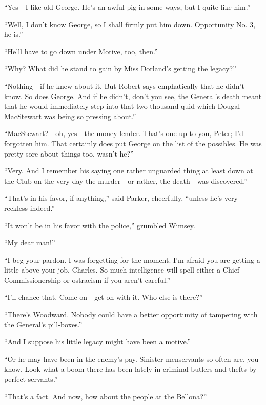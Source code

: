 \enquote{Yes\allowbreak---\allowbreak I like old George. He's an awful pig in some ways, but I quite like him.}

\enquote{Well, I don't know George, so I shall firmly put him down. Opportunity No. 3, he is.}

\enquote{He'll have to go down under Motive, too, then.}

\enquote{Why? What did he stand to gain by Miss Dorland's getting the legacy?}

\enquote{Nothing\allowbreak---\allowbreak if he knew about it. But Robert says emphatically that he didn't know. So does George. And if he didn't, don't you see, the General's death meant that he would immediately step into that two thousand quid which Dougal MacStewart was being so pressing about.}

\enquote{MacStewart?---oh, yes\allowbreak---\allowbreak the money-lender. That's one up to you, Peter; I'd forgotten him. That certainly does put George on the list of the possibles. He was pretty sore about things too, wasn't he?}

\enquote{Very. And I remember his saying one rather unguarded thing at least down at the Club on the very day the murder\allowbreak---\allowbreak or rather, the death\allowbreak---\allowbreak was discovered.}

\enquote{That's in his favor, if anything,} said Parker, cheerfully, \enquote{unless he's very reckless indeed.}

\enquote{It won't be in his favor with the police,} grumbled Wimsey.

\enquote{My dear man!}

\enquote{I beg your pardon. I was forgetting for the moment. I'm afraid you are getting a little above your job, Charles. So much intelligence will spell either a Chief-Commissionership or ostracism if you aren't careful.}

\enquote{I'll chance that. Come on\allowbreak---\allowbreak get on with it. Who else is there?}

\enquote{There's Woodward. Nobody could have a better opportunity of tampering with the General's pill-boxes.}

\enquote{And I suppose his little legacy might have been a motive.}

\enquote{Or he may have been in the enemy's pay. Sinister menservants so often are, you know. Look what a boom there has been lately in criminal butlers and thefts by perfect servants.}

\enquote{That's a fact. And now, how about the people at the Bellona?}

